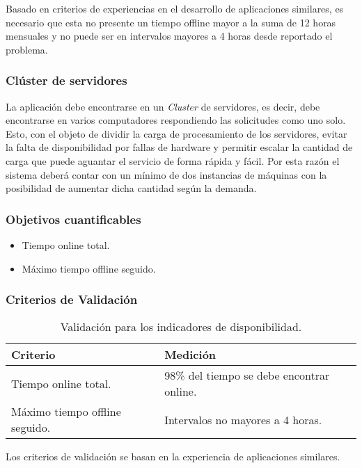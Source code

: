 Basado en criterios de experiencias en el desarrollo de aplicaciones similares, es necesario que esta no presente un tiempo offline mayor a la suma de 12 horas mensuales y no puede ser en intervalos mayores a 4 horas desde reportado el problema.

\subsubsection{Clúster de servidores}

La aplicación debe encontrarse en un \emph{Cluster} de servidores, es decir, debe encontrarse en varios computadores respondiendo las solicitudes como uno solo. Esto, con el objeto de dividir la carga de procesamiento de los servidores, evitar la falta de disponibilidad por fallas de hardware y permitir escalar la cantidad de carga que puede aguantar el servicio de forma rápida y fácil. Por esta razón el sistema deberá contar con un mínimo de dos instancias de máquinas con la posibilidad de aumentar dicha cantidad según la demanda.

\subsubsection{Objetivos cuantificables}

\begin{itemize}
	\item
	Tiempo online total.
	\item
	Máximo tiempo offline seguido.
\end{itemize}

\subsubsection{Criterios de Validación}

\begin{table}[H]
    \caption[Validación para los indicadores de disponibilidad.] {Validación para los indicadores de disponibilidad.}
    \label{tbl:Criterios de Validación disponibilidad}
    \begin{tabular}{|p{}|p{}|}
        \hline
        \textbf{Criterio} &  \textbf{Medición}\\
    	\hline
    	\hline
    	Tiempo online total.  & 98\% del tiempo se debe encontrar online.  \\ \hline
    	Máximo tiempo offline seguido.  & Intervalos no mayores a 4 horas.  \\ \hline
    \end{tabular}
\end{table}
Los criterios de validación se basan en la experiencia de aplicaciones similares.

